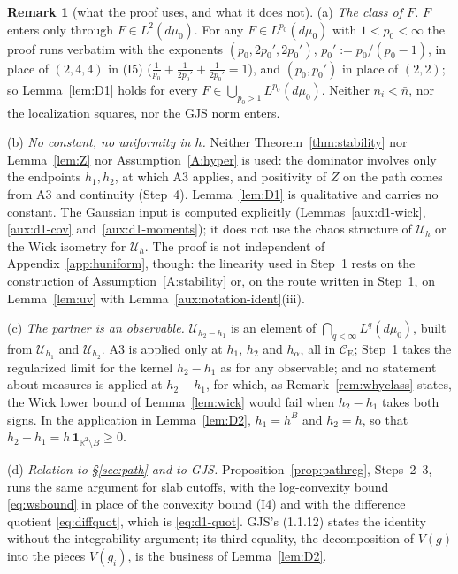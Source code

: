 \documentclass[11pt,a4paper]{article}
\theoremstyle{plain}
\theoremstyle{definition}
\theoremstyle{plain}
\theoremstyle{definition}
\newtheorem{auxrem}[auxlemma]{Remark}
\newcommand{\R}{\mathbb{R}}
\newcommand{\CE}{\mathcal{C}_{\mathrm E}}
\newcommand{\Uc}{\mathcal U}
\newcommand{\dmu}{d\mu_0}
\begin{document}
\begin{auxrem}[what the proof uses, and what it does not]\label{aux:d1-uses}
(a) \emph{The class of $F$.} $F$ enters only through $F\in L^2(\dmu)$. For any
$F\in L^{p_0}(\dmu)$ with $1<p_0<\infty$ the proof runs verbatim with the exponents
$(p_0,2p_0',2p_0')$, $p_0':=p_0/(p_0-1)$, in place of $(2,4,4)$ in (I5)
($\frac1{p_0}+\frac1{2p_0'}+\frac1{2p_0'}=1$), and $(p_0,p_0')$ in place of $(2,2)$; so
Lemma~\ref{lem:D1} holds for every $F\in\bigcup_{p_0>1}L^{p_0}(\dmu)$. Neither $n_i<\bar n$,
nor the localization squares, nor the GJS norm enters.

(b) \emph{No constant, no uniformity in $h$.} Neither Theorem~\ref{thm:stability} nor
Lemma~\ref{lem:Z} nor Assumption~\ref{A:hyper} is used: the dominator involves only the
endpoints $h_1,h_2$, at which A3 applies, and positivity of $Z$ on the path comes from A3 and
continuity (Step~4).  Lemma~\ref{lem:D1} is qualitative and carries no constant. The Gaussian
input is computed explicitly (Lemmas~\ref{aux:d1-wick}, \ref{aux:d1-cov}
and~\ref{aux:d1-moments}); it does not use the chaos structure of $\Uc_h$ or the Wick isometry
for $\Uc_h$.  The proof is not independent of Appendix~\ref{app:huniform}, though: the
linearity used in Step~1 rests on the construction of Assumption~\ref{A:stability} or, on the
route written in Step~1, on Lemma~\ref{lem:uv} with Lemma~\ref{aux:notation-ident}(iii).

(c) \emph{The partner is an observable.} $\Uc_{h_2-h_1}$ is an element of
$\bigcap_{q<\infty}L^q(\dmu)$, built from $\Uc_{h_1}$ and $\Uc_{h_2}$. A3 is applied only at
$h_1$, $h_2$ and $h_\alpha$, all in $\CE$; Step~1 takes the regularized limit for the kernel
$h_2-h_1$ as for any observable; and no statement about measures is applied at $h_2-h_1$,
for which, as Remark~\ref{rem:whyclass} states, the Wick lower bound of
Lemma~\ref{lem:wick} would fail when $h_2-h_1$ takes both signs. In the application in
Lemma~\ref{lem:D2}, $h_1=h^B$ and $h_2=h$, so that $h_2-h_1=h\,\mathbf 1_{\R^2\setminus B}\ge0$.

(d) \emph{Relation to \S\ref{sec:path} and to GJS.} Proposition~\ref{prop:pathreg}, Steps~2--3, runs the same argument for slab cutoffs, with the log-convexity bound
\eqref{eq:wsbound} in place of the convexity bound (I4) and with the difference quotient
\eqref{eq:diffquot}, which is \eqref{eq:d1-quot}. GJS's (1.1.12) states the identity without the
integrability argument; its third equality, the decomposition of $V(g)$ into the pieces
$V(g_i)$, is the business of Lemma~\ref{lem:D2}.
\end{auxrem}
\end{document}
